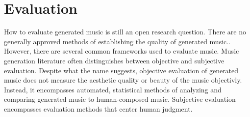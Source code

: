 \section{Evaluation} \label{section:evaluation}
How to evaluate generated music is still an open research question. There are no generally approved methods of establishing the quality of generated music.\cite{Yin_Reuben_Stepney_Collins_2023}. However, there are several common frameworks used to evaluate music. Music generation literature often distinguishes between objective and subjective evaluation. Despite what the name suggests, objective evaluation of generated music does not measure the aesthetic quality or beauty of the music objectivly. Instead, it encompasses automated, statistical methods of analyzing and comparing generated music to human-composed music. Subjective evaluation encompasses evaluation methods that center human judgment. 

